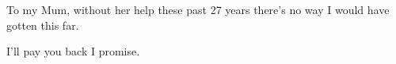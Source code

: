 
\begin{dedication} %

To my Mum, without her help these past 27 years there's no way I would have gotten this far.

I'll pay you back I promise.

\end{dedication}


